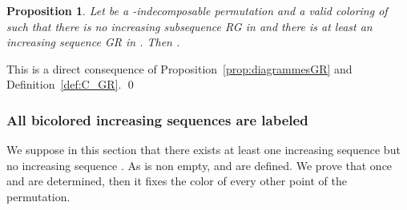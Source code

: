 \documentclass[11pt]{article}
\newenvironment{pf}{{\em \noindent Proof:}}{ \hfill \qed\smallskip}
\newtheorem{prop}[thm]{Proposition}
\newcommand{\ascentRG}{increasing sequence \xspace}
\newcommand{\ascentGR}{increasing sequence \xspace}
\begin{document}
\begin{prop}\label{prop:C_GR}
Let  be a -indecomposable permutation and  a valid coloring of  such that there is no increasing subsequence RG in  and there is at least an increasing sequence GR in . 
Then .
\end{prop}

\begin{pf}
This is a direct consequence of Proposition~\ref{prop:diagrammesGR} and Definition~\ref{def:C_GR}.
\end{pf}


\subsubsection{All bicolored increasing sequences are labeled }

We suppose in this section that there exists at least one \ascentRG but no \ascentGR.
As  is non empty,  and  are defined.
We prove that once  and  are determined, then it fixes the color of every other point of the permutation.
\end{document}
